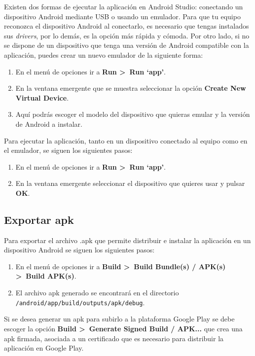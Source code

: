 Existen dos formas de ejecutar la aplicación en Android Studio: conectando un dispositivo Android mediante USB o usando un emulador. Para que tu equipo reconozca el dispositivo Android al conectarlo, es necesario que tengas instalados sus \textit{drivers}, por lo demás, es la opción más rápida y cómoda. Por otro lado, si no se dispone de un dispositivo que tenga una versión de Android compatible con la aplicación, puedes crear un nuevo emulador de la siguiente forma: 

\begin{enumerate}
	\item En el menú de opciones ir a \textbf{Run >~Run `app'}. 
	\item En la ventana emergente que se muestra seleccionar la opción \textbf{Create New Virtual Device}. 
	\item Aquí podrás escoger el modelo del dispositivo que quieras emular y la versión de Android a instalar. 
\end{enumerate}

Para ejecutar la aplicación, tanto en un dispositivo conectado al equipo como en el emulador, se siguen los siguientes pasos: 

\begin{enumerate}
	\item En el menú de opciones ir a \textbf{Run >~Run `app'}.
	\item En la ventana emergente seleccionar el dispositivo que quieres usar y pulsar \textbf{OK}. 
\end{enumerate}

\subsection{Exportar apk}

Para exportar el archivo .apk que permite distribuir e instalar la aplicación en un dispositivo Android se siguen los siguientes pasos: 

\begin{enumerate}
	\item En el menú de opciones ir a \textbf{Build >~Build Bundle(s) / APK(s) >~Build APK(s)}. 
	\item El archivo apk generado se encontrará en el directorio \\ \texttt{/android/app/build/outputs/apk/debug}.
\end{enumerate}

Si se desea generar un apk para subirlo a la plataforma Google Play se debe escoger la opción \textbf{Build >~Generate Signed Build / APK...} que crea una apk firmada, asociada a un certificado que es necesario para distribuir la aplicación en Google Play. 


